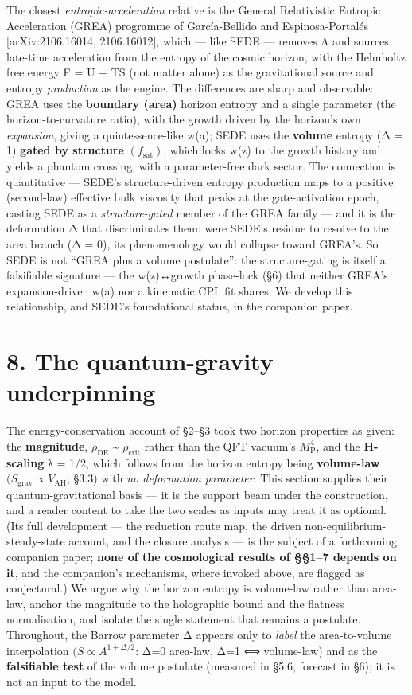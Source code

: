 \documentclass[
  10pt,
]{article}
\begin{document}
The closest \emph{entropic-acceleration} relative is the General
Relativistic Entropic Acceleration (GREA) programme of García-Bellido
and Espinosa-Portalés {[}arXiv:2106.16014, 2106.16012{]}, which --- like
SEDE --- removes Λ and sources late-time acceleration from the entropy
of the cosmic horizon, with the Helmholtz free energy F = U − TS (not
matter alone) as the gravitational source and entropy \emph{production}
as the engine. The differences are sharp and observable: GREA uses the
\textbf{boundary (area)} horizon entropy and a single parameter (the
horizon-to-curvature ratio), with the growth driven by the horizon's own
\emph{expansion}, giving a quintessence-like w(a); SEDE uses the
\textbf{volume} entropy (Δ = 1) \textbf{gated by structure}
\((f_{\mathrm{sat}})\), which locks w(z) to the growth history and
yields a phantom crossing, with a parameter-free dark sector. The
connection is quantitative --- SEDE's structure-driven entropy
production maps to a positive (second-law) effective bulk viscosity that
peaks at the gate-activation epoch, casting SEDE as a
\emph{structure-gated} member of the GREA family --- and it is the
deformation Δ that discriminates them: were SEDE's residue to resolve to
the area branch (Δ = 0), its phenomenology would collapse toward GREA's.
So SEDE is not ``GREA plus a volume postulate'': the structure-gating is
itself a falsifiable signature --- the w(z)↔growth phase-lock (§6) that
neither GREA's expansion-driven w(a) nor a kinematic CPL fit shares. We
develop this relationship, and SEDE's foundational status, in the
companion paper.

\section{8. The quantum-gravity
underpinning}\label{the-quantum-gravity-underpinning}

The energy-conservation account of §2--§3 took two horizon properties as
given: the \textbf{magnitude}, \(\rho _{\mathrm{DE}}\) \textasciitilde{}
\(\rho _{\mathrm{crit}}\) rather than the QFT vacuum's
\(M_{\mathrm{P}}^{4}\), and the \textbf{H-scaling} λ = 1/2, which
follows from the horizon entropy being \textbf{volume-law}
\((S_{\mathrm{grav}} \propto  V_{\mathrm{AH}}\); §3.3) with \emph{no
deformation parameter}. This section supplies their
quantum-gravitational basis --- it is the support beam under the
construction, and a reader content to take the two scales as inputs may
treat it as optional. (Its full development --- the reduction route map,
the driven non-equilibrium-steady-state account, and the closure
analysis --- is the subject of a forthcoming companion paper;
\textbf{none of the cosmological results of §§1--7 depends on it}, and
the companion's mechanisms, where invoked above, are flagged as
conjectural.) We argue why the horizon entropy is volume-law rather than
area-law, anchor the magnitude to the holographic bound and the flatness
normalisation, and isolate the single statement that remains a
postulate. Throughout, the Barrow parameter Δ appears only to
\emph{label} the area-to-volume interpolation
\((S \propto  A^{1+\Delta /2}\): Δ=0 area-law, Δ=1 ⟺ volume-law) and as
the \textbf{falsifiable test} of the volume postulate (measured in §5.6,
forecast in §6); it is not an input to the model.
\end{document}
